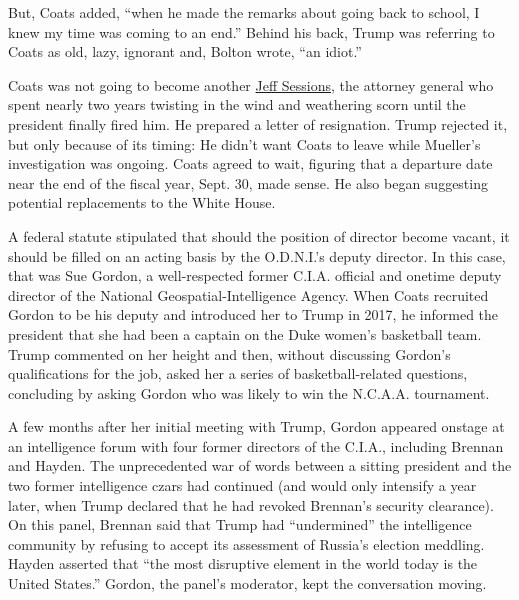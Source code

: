 But, Coats added, ``when he made the remarks about going back to school,
I knew my time was coming to an end.'' Behind his back, Trump was
referring to Coats as old, lazy, ignorant and, Bolton wrote, ``an
idiot.''

Coats was not going to become another
\href{https://www.nytimes.com/2020/06/30/magazine/jeff-sessions.html}{Jeff
Sessions}, the attorney general who spent nearly two years twisting in
the wind and weathering scorn until the president finally fired him. He
prepared a letter of resignation. Trump rejected it, but only because of
its timing: He didn't want Coats to leave while Mueller's investigation
was ongoing. Coats agreed to wait, figuring that a departure date near
the end of the fiscal year, Sept. 30, made sense. He also began
suggesting potential replacements to the White House.

A federal statute stipulated that should the position of director become
vacant, it should be filled on an acting basis by the O.D.N.I.'s deputy
director. In this case, that was Sue Gordon, a well-respected former
C.I.A. official and onetime deputy director of the National
Geospatial-Intelligence Agency. When Coats recruited Gordon to be his
deputy and introduced her to Trump in 2017, he informed the president
that she had been a captain on the Duke women's basketball team. Trump
commented on her height and then, without discussing Gordon's
qualifications for the job, asked her a series of basketball-related
questions, concluding by asking Gordon who was likely to win the
N.C.A.A. tournament.

A few months after her initial meeting with Trump, Gordon appeared
onstage at an intelligence forum with four former directors of the
C.I.A., including Brennan and Hayden. The unprecedented war of words
between a sitting president and the two former intelligence czars had
continued (and would only intensify a year later, when Trump declared
that he had revoked Brennan's security clearance). On this panel,
Brennan said that Trump had ``undermined'' the intelligence community by
refusing to accept its assessment of Russia's election meddling. Hayden
asserted that ``the most disruptive element in the world today is the
United States.'' Gordon, the panel's moderator, kept the conversation
moving.


